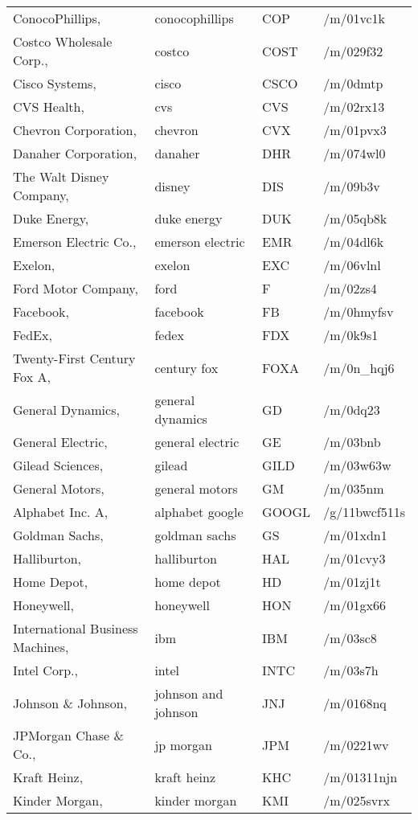 \begin{longtable}[c]{llll}
ConocoPhillips, & conocophillips & COP & /m/01vc1k \\
Costco Wholesale Corp., & costco & COST & /m/029f32 \\
Cisco Systems, & cisco & CSCO & /m/0dmtp \\
CVS Health, & cvs & CVS & /m/02rx13 \\
Chevron Corporation, & chevron & CVX & /m/01pvx3 \\
Danaher Corporation, & danaher & DHR & /m/074wl0 \\
The Walt Disney Company, & disney & DIS & /m/09b3v \\
Duke Energy, & duke energy & DUK & /m/05qb8k \\
Emerson Electric Co., & emerson electric & EMR & /m/04dl6k \\
Exelon, & exelon & EXC & /m/06vlnl \\
Ford Motor Company, & ford & F & /m/02zs4 \\
Facebook, & facebook & FB & /m/0hmyfsv \\
FedEx, & fedex & FDX & /m/0k9s1 \\
Twenty-First Century Fox A, & century fox & FOXA & /m/0n\_hqj6 \\
General Dynamics, & general dynamics & GD & /m/0dq23 \\
General Electric, & general electric & GE & /m/03bnb \\
Gilead Sciences, & gilead & GILD & /m/03w63w \\
General Motors, & general motors & GM & /m/035nm \\
Alphabet Inc. A, & alphabet google & GOOGL & /g/11bwcf511s \\
Goldman Sachs, & goldman sachs & GS & /m/01xdn1 \\
Halliburton, & halliburton & HAL & /m/01cvy3 \\
Home Depot, & home depot & HD & /m/01zj1t \\
Honeywell, & honeywell & HON & /m/01gx66 \\
International Business Machines, & ibm & IBM & /m/03sc8 \\
Intel Corp., & intel & INTC & /m/03s7h \\
Johnson \& Johnson, & johnson and johnson & JNJ & /m/0168nq \\
JPMorgan Chase \& Co., & jp morgan & JPM & /m/0221wv \\
Kraft Heinz, & kraft heinz & KHC & /m/01311njn \\
Kinder Morgan, & kinder morgan & KMI & /m/025svrx \\

\end{longtable}
